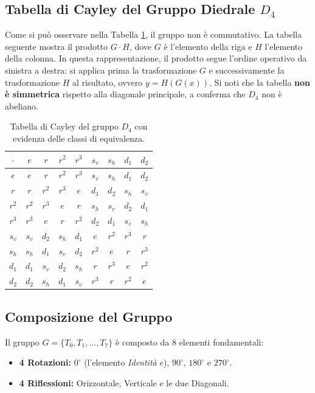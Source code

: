 \subsection{Tabella di Cayley del Gruppo Diedrale $D_4$}
Come si può osservare nella Tabella \ref{tab:cayley_d4}, il gruppo non è commutativo.
La tabella seguente mostra il prodotto $G \cdot H$, dove $G$ è l'elemento della riga e $H$ l'elemento della colonna. 
In questa rappresentazione, il prodotto segue l'ordine operativo da sinistra a destra: si applica prima la
trasformazione $G$ e successivamente la trasformazione $H$ al risultato, ovvero $y = H(G(x))$.
Si noti che la tabella \textbf{non è simmetrica} rispetto alla diagonale principale, a conferma che $D_4$ non è abeliano.

\begin{table}[h]
\centering
\renewcommand{\arraystretch}{1.8} %
\setlength{\tabcolsep}{10pt}      %
\begin{tabular}{c|cccc|cccc}
$\cdot$ & $e$ & $r$ & $r^2$ & $r^3$ & $s_v$ & $s_h$ & $d_1$ & $d_2$ \\ \hline
$e$     & $e$ & $r$ & $r^2$ & $r^3$ & $s_v$ & $s_h$ & $d_1$ & $d_2$ \\
$r$     & $r$ & $r^2$ & $r^3$ & $e$   & $d_1$ & $d_2$ & $s_h$ & $s_v$ \\
$r^2$   & $r^2$ & $r^3$ & $e$   & $r$   & $s_h$ & $s_v$ & $d_2$ & $d_1$ \\
$r^3$   & $r^3$ & $e$   & $r$   & $r^2$ & $d_2$ & $d_1$ & $s_v$ & $s_h$ \\ \hline
$s_v$   & $s_v$ & $d_2$ & $s_h$ & $d_1$ & $e$   & $r^2$ & $r^3$ & $r$   \\
$s_h$   & $s_h$ & $d_1$ & $s_v$ & $d_2$ & $r^2$ & $e$   & $r$   & $r^3$ \\
$d_1$   & $d_1$ & $s_v$ & $d_2$ & $s_h$ & $r$   & $r^3$ & $e$   & $r^2$ \\
$d_2$   & $d_2$ & $s_h$ & $d_1$ & $s_v$ & $r^3$ & $r$   & $r^2$ & $e$   \\
\end{tabular}
  \caption{Tabella di Cayley del gruppo $D_4$ con evidenza delle classi di equivalenza.}
  \label{tab:cayley_d4}
\end{table}

\subsection{Composizione del Gruppo}
Il gruppo $G = \{T_0, T_1, \dots, T_7\}$ è composto da 8 elementi fondamentali:
\begin{itemize}
  \item \textbf{4 Rotazioni:} $0^\circ$ (l'elemento \textit{Identità} $e$), $90^\circ$, $180^\circ$ e $270^\circ$.
  \item \textbf{4 Riflessioni:} Orizzontale, Verticale e le due Diagonali.
\end{itemize}

